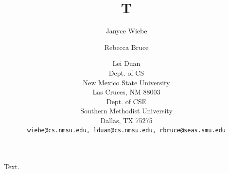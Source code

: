 \documentclass{article}
\title{T}
\author{Janyce Wiebe\dag \and Rebecca Bruce\ddag \and Lei Duan\dag \\
\dag Dept. of CS \\
New Mexico State University \\
Las Cruces, NM 88003 \\
\ddag Dept. of CSE \\
Southern Methodist University \\
Dallas, TX 75275 \\
{\tt wiebe@cs.nmsu.edu, lduan@cs.nmsu.edu, rbruce@seas.smu.edu}}
\begin{document}
\maketitle
Text.
\end{document}
